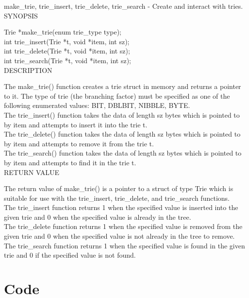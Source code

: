 \documentclass{llncs}
\begin{document}
make\_trie, trie\_insert, trie\_delete, trie\_search - Create and interact with tries.\\

\noindent SYNOPSIS

Trie *make\_trie(enum trie\_type type);\\
\indent int trie\_insert(Trie *t, void *item, int sz);\\
\indent int trie\_delete(Trie *t, void *item, int sz);\\
\indent int trie\_search(Trie *t, void *item, int sz);\\

\noindent DESCRIPTION

\noindent The make\_trie() function creates a trie struct in memory and returns a pointer to it. The type of trie (the branching factor) must be specified as one of the following enumerated values: BIT, DBLBIT, NIBBLE, BYTE.\\
The trie\_insert() function takes the data of length sz bytes which is pointed to by item and attempts to insert it into the trie t.\\
The trie\_delete() function takes the data of length sz bytes which is pointed to by item and attempts to remove it from the trie t.\\
The trie\_search() function takes the data of length sz bytes which is pointed to by item and attempts to find it in the trie t.\\

\noindent RETURN VALUE

\noindent The return value of make\_trie() is a pointer to a struct of type Trie which is suitable for use with the trie\_insert, trie\_delete, and trie\_search functions.\\
The trie\_insert function returns 1 when the specified value is inserted into the given trie and 0 when the specified value is already in the tree.\\
The trie\_delete function returns 1 when the specified value is removed from the given trie and 0 when the specified value is not already in the tree to remove.\\
The trie\_search function returns 1 when the specified value is found in the given trie and 0 if the specified value is not found.\\

\newpage
\section{Code}

\newpage

\end{document}
